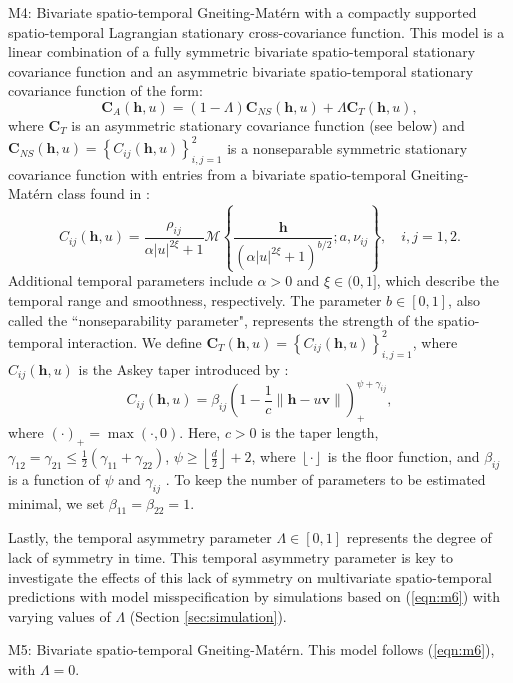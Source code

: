 \documentclass[12pt]{article}
\newcommand{\0}{\mathbf{0}}
\begin{document}
\begin{compactitem}
\item M4: Bivariate spatio-temporal Gneiting-Mat\'{e}rn with a compactly supported spatio-temporal Lagrangian stationary cross-covariance function. This model is a linear combination of a fully symmetric bivariate spatio-temporal stationary covariance function and an asymmetric bivariate spatio-temporal stationary covariance function of the form: 
\begin{equation}\label{eqn:m6}
\mathbf{C}_A(\mathbf{h},u)=(1-\Lambda)\mathbf{C}_{NS}(\mathbf{h},u)+\Lambda \mathbf{C}_{T}(\mathbf{h},u) ,
\end{equation}
where $\mathbf{C}_T$ is an asymmetric stationary covariance function (see below) and $\mathbf{C}_{NS}(\mathbf{h},u)=\left\{C_{ij}(\mathbf{h},u)\right\}_{i,j=1}^{2}$ is a nonseparable symmetric stationary covariance function with entries from a bivariate spatio-temporal Gneiting-Mat\'{e}rn class found in \citet{bourotte2016flexible}:
\begin{equation}\label{eqn:bivariategneitingmatern}
C_{ij}(\mathbf{h},u)=\frac{\rho_{ij}}{\alpha |u|^{2\xi}+1}\mathcal{M}\left\{\frac{\mathbf{h}}{(\alpha |u|^{2\xi}+1)^{b/2}};a,\nu_{ij}\right\},\quad i,j=1,2.
\end{equation}
Additional temporal parameters include $\alpha>0$ and $\xi\in (0,1]$, which describe the temporal range and smoothness, respectively. The parameter $b\in [0,1]$, also called the ``nonseparability parameter", represents the strength of the spatio-temporal interaction. We define $\mathbf{C}_{T}(\mathbf{h},u)=\left\{C_{ij}(\mathbf{h},u)\right\}_{i,j=1}^{2}$, where $C_{ij}(\mathbf{h},u)$ is the Askey taper introduced by \citet{roh2015multivariate}:
\begin{equation}
C_{ij}(\mathbf{h},u)=\beta_{ij}\left(1-\frac{1}{c}\|\mathbf{h}-u\mathbf{v}\|\right)_{+}^{\psi+\gamma_{ij}},
\end{equation}
where $(\cdot)_{+}=\max(\cdot,0)$. Here, $c>0$ is the taper length, $\gamma_{12}=\gamma_{21}\leq \frac{1}{2}(\gamma_{11}+\gamma_{22})$, $\psi\geq \left \lfloor{\frac{d}{2}}\right \rfloor+2$, where $\left \lfloor{\cdot}\right \rfloor$ is the floor function, and $\beta_{ij}$ is a function of $\psi$ and $\gamma_{ij}$ \citep{roh2015multivariate}. To keep the number of parameters to be estimated minimal, we set $\beta_{11}=\beta_{22}=1$.

Lastly, the temporal asymmetry parameter $\Lambda\in [0,1]$ represents the degree of lack of symmetry in time. This temporal asymmetry parameter is key to investigate the effects of this lack of symmetry on multivariate spatio-temporal predictions with model misspecification by simulations based on (\ref{eqn:m6}) with varying values of $\Lambda$ (Section \ref{sec:simulation}).

\item M5: Bivariate spatio-temporal Gneiting-Mat\'{e}rn. This model follows (\ref{eqn:m6}), with $\Lambda=0$. %
\end{compactitem}
\end{document}
